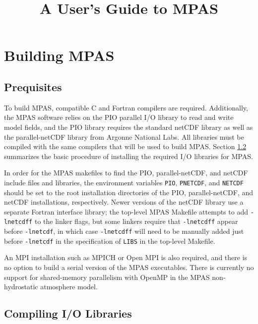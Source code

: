 \documentclass[11pt]{report}
\begin{document}
\title{A User's Guide to MPAS}
\author{}

\maketitle
\tableofcontents



\chapter{Building MPAS}

\section{Prequisites}

To build MPAS, compatible C and Fortran compilers are required. Additionally, the MPAS software relies on the PIO parallel I/O library to read and write model fields, and the PIO library requires the standard netCDF library as well as the parallel-netCDF library from Argonne National Labs. All libraries must be compiled with the same compilers that will be used to build MPAS. Section \ref{sec:build_io} summarizes the basic procedure of installing the required I/O libraries for MPAS.

In order for the MPAS makefiles to find the PIO, parallel-netCDF, and netCDF include files and libraries, the environment variables {\tt PIO}, {\tt PNETCDF}, and {\tt NETCDF} should be set to the root installation directories of the PIO, parallel-netCDF, and netCDF installations, respectively. Newer versions of the netCDF library use a separate Fortran interface library; the top-level MPAS Makefile attempts to add {\tt -lnetcdff} to the linker flags, but some linkers require that {\tt -lnetcdff} appear before {\tt -lnetcdf}, in which case {\tt -lnetcdff} will need to be manually added just before {\tt -lnetcdf} in the specification of {\tt LIBS} in the top-level Makefile.

An MPI installation such as MPICH or Open MPI is also required, and there is no option to build a serial version of the MPAS executables. There is currently no support for shared-memory parallelism with OpenMP in the MPAS non-hydrostatic atmosphere model.


\section{Compiling I/O Libraries}
\label{sec:build_io}
\end{document}
